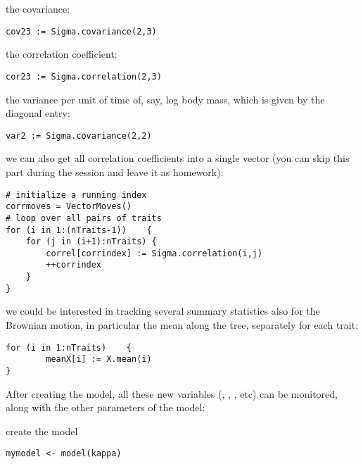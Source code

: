 the covariance:
{\tt \small \begin{snugshade*}
\begin{lstlisting}
cov23 := Sigma.covariance(2,3)
\end{lstlisting}
\end{snugshade*}}
the correlation coefficient:
{\tt \small \begin{snugshade*}
\begin{lstlisting}
cor23 := Sigma.correlation(2,3)
\end{lstlisting}
\end{snugshade*}}
the variance per unit of time of, say, log body mass, which is given by the diagonal entry:
{\tt \small \begin{snugshade*}
\begin{lstlisting}
var2 := Sigma.covariance(2,2)
\end{lstlisting}
\end{snugshade*}}
we can also get all correlation coefficients into a single vector (you can skip this part during the session and leave it as  homework):
{\tt \small \begin{snugshade*}
\begin{lstlisting}
# initialize a running index
corrmoves = VectorMoves()
# loop over all pairs of traits
for (i in 1:(nTraits-1))    {
    for (j in (i+1):nTraits) {
        correl[corrindex] := Sigma.correlation(i,j)
        ++corrindex
    }
}
\end{lstlisting}
\end{snugshade*}}
we could be interested in tracking several summary statistics also for the Brownian motion, in particular the mean along the tree, separately for each trait:
{\tt \small \begin{snugshade*}
\begin{lstlisting}
for (i in 1:nTraits)    {
        meanX[i] := X.mean(i)
}
\end{lstlisting}
\end{snugshade*}}

After creating the model, all these new variables (, , , etc) can be monitored, along with the other parameters of the model:

create the model
{\tt \small \begin{snugshade*}
\begin{lstlisting}
mymodel <- model(kappa)
\end{lstlisting}
\end{snugshade*}}

